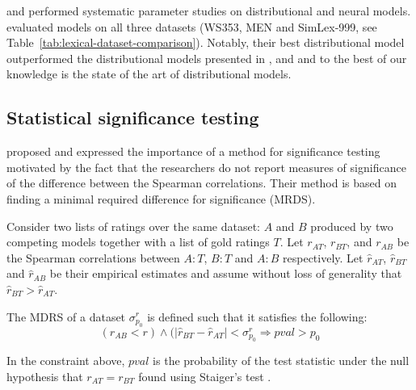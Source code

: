 
 and  performed systematic parameter studies on distributional and neural models.  evaluated models on all three datasets (WS353, MEN and SimLex-999, see Table~\ref{tab:lexical-dataset-comparison}). Notably, their best distributional model outperformed the distributional models presented in \citet{hill2014simlex}, \citet{kiela-clark:2014:CVSC} and \citet{baroni-dinu-kruszewski:2014:P14-1} and to the best of our knowledge is the state of the art of distributional models.

\subsection{Statistical significance testing}
\label{sec:stat-sign}

\citet{rastogi-vandurme-arora:2015:NAACL-HLT} proposed and \citet{W16-2506} expressed the importance of a method for significance testing motivated by the fact that the researchers do not report measures of significance of the difference between the Spearman correlations. Their method is based on finding a minimal required difference for significance (MRDS).

Consider two lists of ratings over the same dataset: $A$ and $B$ produced by two competing models together with a list of gold ratings $T$. Let $r_{AT}$, $r_{BT}$, and $r_{AB}$ be the Spearman correlations between $A{:}T$, $B{:}T$ and $A{:}B$ respectively. Let $\hat{r}_{AT}$, $\hat{r}_{BT}$ and $\hat{r}_{AB}$ be their empirical estimates and assume without loss of generality that $\hat{r}_{BT}>\hat{r}_{AT}$.

The MDRS of a dataset $\sigma^{r}_{p_0}$ is defined such that it satisfies the following:
\begin{equation}
(r_{AB} < r) \wedge (|\hat{r}_{BT} - \hat{r}_{AT}| < \sigma^r_{p_0} \Rightarrow \mathit{pval} > p_0
\end{equation}

In the constraint above, $\mathit{pval}$ is the probability of the test statistic under the null hypothesis that $r_{AT} = r_{BT}$ found using Staiger's test \cite{steiger1980tests}.

